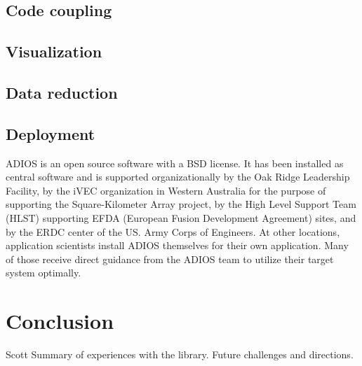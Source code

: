 \subsection{Code coupling}



\subsection{Visualization}



\subsection{Data reduction}




\subsection{Deployment}
ADIOS is an open source software with a BSD license. It has been installed as central software and is supported organizationally by the Oak Ridge Leadership Facility, by the iVEC organization in Western Australia for the purpose of supporting the Square-Kilometer Array project, by the High Level Support Team (HLST) supporting EFDA (European Fusion Development Agreement) sites, and by the ERDC center of the US. Army Corps of Engineers. At other locations, application scientists install ADIOS themselves for their own application. Many of those receive direct guidance from the ADIOS team to utilize their target system optimally.





\section{Conclusion}
{\color {red}Scott}
{\color {red}Summary of experiences with the library. Future challenges and directions.}


